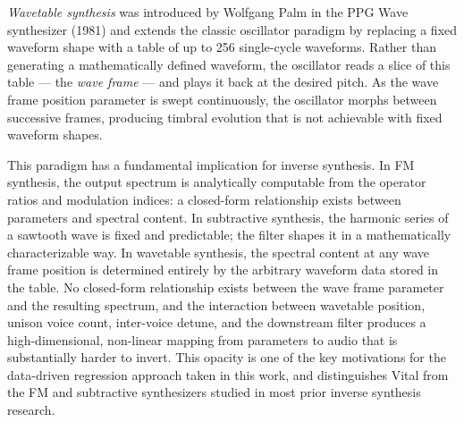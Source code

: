 
\textit{Wavetable synthesis} was introduced by Wolfgang Palm in the PPG Wave synthesizer (1981) and extends the classic oscillator paradigm by replacing a fixed waveform shape with a table of up to 256 single-cycle waveforms. Rather than generating a mathematically defined waveform, the oscillator reads a slice of this table --- the \textit{wave frame} --- and plays it back at the desired pitch. As the wave frame position parameter is swept continuously, the oscillator morphs between successive frames, producing timbral evolution that is not achievable with fixed waveform shapes.

\par \vspace{0.3cm}

\noindent This paradigm has a fundamental implication for inverse synthesis. In FM synthesis, the output spectrum is analytically computable from the operator ratios and modulation indices: a closed-form relationship exists between parameters and spectral content. In subtractive synthesis, the harmonic series of a sawtooth wave is fixed and predictable; the filter shapes it in a mathematically characterizable way. In wavetable synthesis, the spectral content at any wave frame position is determined entirely by the arbitrary waveform data stored in the table. No closed-form relationship exists between the wave frame parameter and the resulting spectrum, and the interaction between wavetable position, unison voice count, inter-voice detune, and the downstream filter produces a high-dimensional, non-linear mapping from parameters to audio that is substantially harder to invert. This opacity is one of the key motivations for the data-driven regression approach taken in this work, and distinguishes Vital from the FM and subtractive synthesizers studied in most prior inverse synthesis research.

\par \vspace{0.3cm}

